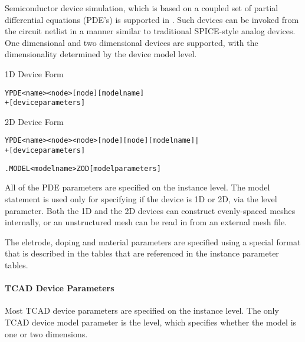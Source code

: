 


Semiconductor device simulation, which is based on a coupled set of partial
differential equations (PDE's) is supported in \Xyce{}.  Such devices can be
invoked from the circuit netlist in a manner similar to traditional SPICE-style
analog devices.  One dimensional and two dimensional devices are supported,
with the dimensionality determined by the device model level.

\begin{Device}

\item[1D Device Form]
\begin{alltt}
YPDE <name> <node> [node] [model name]
+ [device parameters]
\end{alltt}

\vbox{\hrulefill}
\item[2D Device Form]
\begin{alltt}
YPDE <name> <node> <node> [node][node] [model name]|
+ [device parameters]
\end{alltt}

\model
\begin{alltt}
.MODEL <model name> ZOD [model parameters]
\end{alltt}

\comments

All of the PDE parameters are specified on the instance level.  The model
statement is used only for specifying if the device is 1D or 2D, via the level
parameter.  Both the 1D and the 2D devices can construct evenly-spaced meshes
internally, or an unstructured mesh can be read in from an external mesh file.

The eletrode, doping and material parameters are specified using a special
format that is described in the tables that are referenced in the instance
parameter tables.
\end{Device}

\paragraph{TCAD Device Parameters}
Most TCAD device parameters are specified on the instance level.
\noindent
The only TCAD device model parameter is the level, which specifies whether the
model is one or two dimensions.


